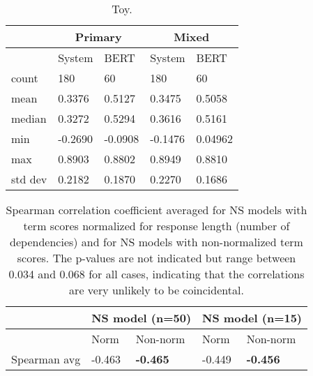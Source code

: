\begin{table}[htb!]
\begin{center}
\begin{tabular}{|l||l|l||l|l|}
\hline
 & \multicolumn{2}{c||}{Primary} & \multicolumn{2}{c|}{Mixed} \\
\hline
& System & BERT & System & BERT \\
\hline
\hline
count & 180 & 60 & 180 & 60 \\
\hline
mean & 0.3376 & 0.5127 & 0.3475 & 0.5058 \\
\hline
median & 0.3272 & 0.5294 & 0.3616 & 0.5161  \\
\hline
min & -0.2690 & -0.0908 & -0.1476 & 0.04962  \\
\hline
max & 0.8903 & 0.8802 & 0.8949 & 0.8810 \\
\hline
std dev & 0.2182 & 0.1870 & 0.2270 & 0.1686 \\
\hline
\end{tabular}
\caption{\label{tab:toy} Toy.}
\end{center}
\end{table}

\begin{table}[htb!]
\begin{center}
\begin{tabular}{|l||l|l||l|l|}
\hline
 & \multicolumn{2}{c||}{NS model (n=50)} & \multicolumn{2}{c|}{NS model (n=15)} \\
\hline
& Norm & Non-norm & Norm & Non-norm \\
\hline
\hline
Spearman avg & -0.463 & \textbf{-0.465} & -0.449 & \textbf{-0.456} \\
\hline
\end{tabular}
\caption{\label{tab:normalize-responses-spearman} Spearman correlation coefficient averaged for NS models with term scores normalized for response length (number of dependencies) and for NS models with non-normalized term scores. The p-values are not indicated but range between 0.034 and 0.068 for all cases, indicating that the correlations are very unlikely to be coincidental.}
\end{center}
\end{table}


